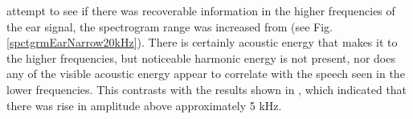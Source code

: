 \DIFdelend \DIFaddbegin {}\DIFaddend attempt to see if there was recoverable information in the higher frequencies of the ear signal, the spectrogram range was increased from \DIFdelbegin {}\DIFdelend \DIFaddbegin {}\DIFaddend (see Fig. \ref{spctgrmEarNarrow20kHz}). There is certainly acoustic energy that makes it to the higher frequencies, but noticeable harmonic energy is not present, nor does any of the visible acoustic energy appear to correlate with the speech seen in the lower frequencies.  This contrasts with the results shown in \cite{hansen:97b}, which indicated that there was \DIFdelbegin {}\DIFdelend \DIFaddbegin {}\DIFaddend rise in amplitude above approximately 5 kHz.
\DIFdelbegin {}\DIFdelend \DIFaddbegin 

